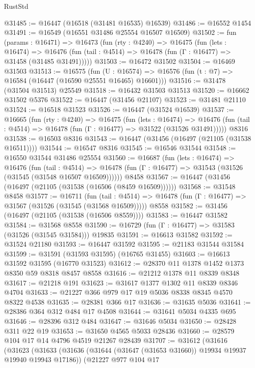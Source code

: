 \begin{lexlean}{RustStd}
\begin{coremodule}
{\begin{coremodule}
{{{{{{{{{{{{{{{{{{{{{{{{{{{{{{{{{{{{{{{{{{{{{{{{{{{{{{{@31485 := @16447 (@16518 (@31481 @16535) @16539)
@31486 := @16552 @1454
@31491 := @16549 (@16551 @31486 @25554 @16507 @16509)
@31502 := fun (params : @16471) =>
  @16473
    (fun (rty : @4240) =>
    @16475
      (fun (lets : @16474) =>
      @16476 (fun (tail : @4514) => @16478 (fun (Γ : @16477) => @31458 (@31485 @31491)))))
@31503 := @16472 @31502
@31504 := @16469 @31503
@31513 := @16575
    (fun (U : @16574) => @16576 (fun (t : @7) => @16584 (@16447 (@16590 @25551 @16465) @16601)))
@31516 := @31478 (@31504 @31513) @25549
@31518 := @16432 @31503 @31513
@31520 := @16662 @31502 @5376
@31522 := @16447 (@31456 @21107)
@31523 := @31481 @21110
@31524 := @16518 @31523
@31526 := @16447 (@31524 @16539)
@31537 := @16665
    (fun (rty : @4240) =>
    @16475
      (fun (lets : @16474) =>
      @16476 (fun (tail : @4514) => @16478 (fun (Γ : @16477) => @31522 (@31526 @31491)))))
    @8316
@31538 := @16503 @8316
@31543 := @16447 (@31456 (@16497 (@21105 (@31538 @16511))))
@31544 := @16547 @8316
@31545 := @16546 @31544
@31548 := @16550 @31544 @31486 @25554
@31560 := @16687
    (fun (lets : @16474) =>
    @16476
      (fun (tail : @4514) =>
      @16478 (fun (Γ : @16477) => @31543 (@31526 (@31545 (@31548 @16507 @16509))))))
    @8458
@31567 := @16447 (@31456 (@16497 (@21105 (@31538 (@16506 (@8459 @16509))))))
@31568 := @31548 @8458
@31577 := @16711
    (fun (tail : @4514) => @16478 (fun (Γ : @16477) => @31567 (@31526 (@31545 (@31568 @16509)))))
    @8558
@31582 := @31456 (@16497 (@21105 (@31538 (@16506 @8559))))
@31583 := @16447 @31582
@31584 := @31568 @8558
@31590 := @16729 (fun (Γ : @16477) => @31583 (@31526 (@31545 @31584))) @19835
@31591 := @16613 @31582
@31592 := @31524 @21180
@31593 := @16447 @31592
@31595 := @21183 @31544 @31584
@31599 := @31591 (@31593 @31595) (@16765 @31455)
@31603 := @16613 @31592 @31595 (@16770 @31523)
@31612 := @28370 @11 @1378 @1452 @1373 @8350 @59 @8318 @8457 @8558
@31616 := @21212 @1378 @11 @8339 @8348
@31617 := @21218 @191
@31623 := @31617 @1377 @1302 @11 @8339 @8346 @4704
@31633 := @21227 @366 @979 @17 @19 @5036 @8338 @8345 @4570 @8322 @4538
@31635 := @28381 @366 @17
@31636 := @31635 @5036
@31641 := @28386 @364 @312 @484 @17 @4508
@31644 := @31641 @5034 @4335 @695
@31646 := @28396 @312 @484
@31647 := @31646 @5034
@31650 := @28428 @311 @22 @19
@31653 := @31650 @4565 @5033 @28436
@31660 := @28579 @104 @17 @14 @4796 @4519 @21267 @28439
@31707 := @31612
    (@31616
      (@31623
        (@31633
          (@31636 (@31644 (@31647 (@31653 @31660)) @19934 @19937 @19940 @19943 @17186))
          (@21227
            @977
            @104
            @17
}}}}}}}}}}}}}}}}}}}}}}}}}}}}}}}}}}}}}}}}}}}}}}}}}}}}}}}
\end{coremodule}}
\end{coremodule}
\end{lexlean}
